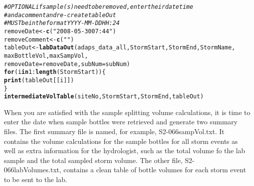\documentclass[a4paper,11pt]{article}\usepackage[]{graphicx}\usepackage[]{color}
\makeatletter
\newcommand{\hlnum}[1]{\textcolor[rgb]{0.686,0.059,0.569}{#1}}%
\newcommand{\hlstr}[1]{\textcolor[rgb]{0.192,0.494,0.8}{#1}}%
\newcommand{\hlcom}[1]{\textcolor[rgb]{0.678,0.584,0.686}{\textit{#1}}}%
\newcommand{\hlopt}[1]{\textcolor[rgb]{0,0,0}{#1}}%
\newcommand{\hlstd}[1]{\textcolor[rgb]{0.345,0.345,0.345}{#1}}%
\newcommand{\hlkwa}[1]{\textcolor[rgb]{0.161,0.373,0.58}{\textbf{#1}}}%
\newcommand{\hlkwb}[1]{\textcolor[rgb]{0.69,0.353,0.396}{#1}}%
\newcommand{\hlkwc}[1]{\textcolor[rgb]{0.333,0.667,0.333}{#1}}%
\newcommand{\hlkwd}[1]{\textcolor[rgb]{0.737,0.353,0.396}{\textbf{#1}}}%
\newenvironment{kframe}{%
 \def\at@end@of@kframe{}%
 \ifinner\ifhmode%
  \def\at@end@of@kframe{\end{minipage}}%
  \begin{minipage}{\columnwidth}%
 \fi\fi%
 \def\FrameCommand##1{\hskip\@totalleftmargin \hskip-\fboxsep
 \colorbox{shadecolor}{##1}\hskip-\fboxsep
     \hskip-\linewidth \hskip-\@totalleftmargin \hskip\columnwidth}%
 \MakeFramed {\advance\hsize-\width
   \@totalleftmargin\z@ \linewidth\hsize
   \@setminipage}}%
 {\par\unskip\endMakeFramed%
 \at@end@of@kframe}
\newenvironment{knitrout}{}{} %
\makeatother
\begin{document}
\begin{knitrout}
\color{fgcolor}\begin{kframe}
\begin{alltt}
\hlcom{# OPTIONAL if sample(s) need to be removed, enter their datetime  }
\hlcom{# and a comment and re-create tableOut}
\hlcom{# MUST be in the format YYYY-MM-DD HH:24}
\hlstd{removeDate} \hlkwb{<-} \hlkwd{c}\hlstd{(}\hlstr{"2008-05-30 07:44"}\hlstd{)}
\hlstd{removeComment} \hlkwb{<-} \hlkwd{c}\hlstd{(}\hlstr{""}\hlstd{)}
\hlstd{tableOut} \hlkwb{<-} \hlkwd{labDataOut}\hlstd{(adaps_data_all,StormStart,StormEnd,StormName,}
                       \hlstd{maxBottleVol,maxSampVol,}
                       \hlkwc{removeDate}\hlstd{=removeDate,}\hlkwc{subNum}\hlstd{=subNum)}
\hlkwa{for} \hlstd{(i} \hlkwa{in} \hlnum{1}\hlopt{:}\hlkwd{length}\hlstd{(StormStart))\{}
  \hlkwd{print}\hlstd{(tableOut[[i]])}
\hlstd{\}}
\hlkwd{intermediateVolTable}\hlstd{(siteNo,StormStart,StormEnd,tableOut)}
\end{alltt}
\end{kframe}
\end{knitrout}


When you are satisfied with the sample splitting volume calculations, it is time to enter the date when sample bottles were retrieved and generate two summary files. The first summary file is named, for example, S2-066sampVol.txt. It contains the volume calculations for the sample bottles for all storm events as well as extra information for the hydrologist, such as the total volume fo the lab sample and the total sampled storm volume. The other file, S2-066labVolumes.txt, contains a clean table of bottle volumes for each storm event to be sent to the lab.
\end{document}
